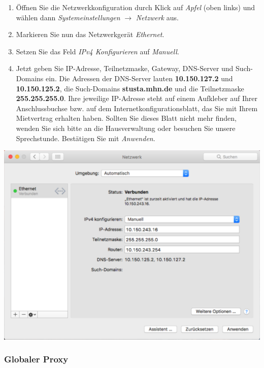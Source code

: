 \documentclass[a4paper,12pt]{scrartcl}
\begin{document}
\begin{minipage}{0.57\textwidth}
\begin{enumerate}
    \item Öffnen Sie die Netzwerkkonfiguration durch Klick auf \emph{Apfel} (oben links) und wählen dann \emph{Systemeinstellungen} $\rightarrow$ \emph{Netzwerk} aus.
    \item Markieren Sie nun das Netzwerkgerät \emph{Ethernet}.
    \item Setzen Sie das Feld \emph{IPv4 Konfigurieren} auf \emph{Manuell}.
    \item Jetzt geben Sie IP-Adresse, Teilnetzmaske, Gateway, DNS-Server und Such-Domains ein. Die Adressen der DNS-Server lauten \textbf{10.150.127.2} und \textbf{10.150.125.2}, die Such-Domains \textbf{stusta.mhn.de} und die Teilnetzmaske \textbf{255.255.255.0}. Ihre jeweilige IP-Adresse steht auf einem Aufkleber auf Ihrer Anschlussbuchse bzw. auf dem Internetkonfigurationsblatt, das Sie mit Ihrem Mietvertrag erhalten haben. Sollten Sie dieses Blatt nicht mehr finden, wenden Sie sich bitte an die Hausverwaltung oder besuchen Sie unsere Sprechstunde.
    Bestätigen Sie mit \emph{Anwenden}.
\end{enumerate}
\end{minipage}
\hfill
\begin{minipage}{0.4\textwidth}
	\centering
	\includegraphics[width=\linewidth,keepaspectratio]{Bilder/IP_MAC}
\end{minipage}

\subsubsection*{Globaler Proxy}
\end{document}
